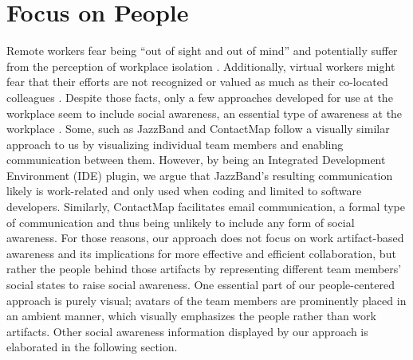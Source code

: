 \section{Focus on People}
Remote workers fear being \enquote{out of sight and out of mind} \autocite{bailey1999advantages} and potentially suffer from the perception of workplace isolation \autocite{mulki2009set, marshall2007workplace}. Additionally, virtual workers might fear that their efforts are not recognized or valued as much as their co-located colleagues \autocite{cooper2002telecommuting}. Despite those facts, only a few approaches developed for use at the workplace seem to include social awareness, an essential type of awareness at the workplace \autocite{greenberg1996awareness}. Some, such as JazzBand and ContactMap \autocite{cheng2003jazzing, whittaker2004contactmap} follow a visually similar approach to us by visualizing individual team members and enabling communication between them. However, by being an Integrated Development Environment (IDE) plugin, we argue that JazzBand's resulting communication likely is work-related and only used when coding and limited to software developers. Similarly, ContactMap facilitates email communication, a formal type of communication and thus being unlikely to include any form of social awareness. For those reasons, our approach does not focus on work artifact-based awareness and its implications for more effective and efficient collaboration, but rather the people behind those artifacts by representing different team members' social states to raise social awareness. One essential part of our people-centered approach is purely visual; avatars of the team members are prominently placed in an ambient manner, which visually emphasizes the people rather than work artifacts. Other social awareness information displayed by our approach is elaborated in the following section.

